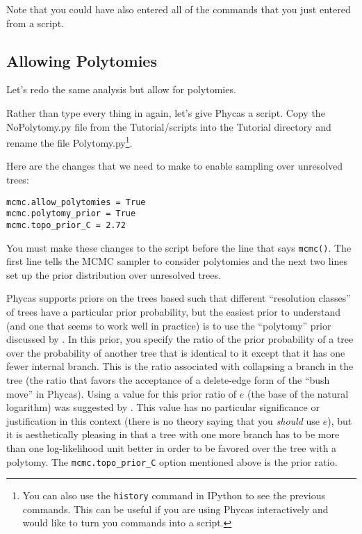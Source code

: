 \documentclass{article}
\newcommand{\cmd}[1]{\texttt{#1}\xspace}
\newcommand{\phycas}{Phycas\xspace}
\newcommand{\localfile}[1]{\textsf{#1}\xspace}
\begin{document}
Note that you could have also entered all of the commands that you just entered from a script. 

\subsection{Allowing Polytomies}
Let's redo the same analysis but allow for polytomies.

Rather than type every thing in again, let's give \phycas a script.
Copy the \localfile{NoPolytomy.py} file from the \localfile{Tutorial/scripts} 
into the \localfile{Tutorial} directory  and rename the file \localfile{Polytomy.py}\footnote{You can also use the \cmd{history} command in IPython to see the previous commands. This can be useful if you are using \phycas interactively and would
like to turn you commands into a script.}.

Here are the changes that we need to make to enable sampling over unresolved trees:
\begin{verbatim}
mcmc.allow_polytomies = True
mcmc.polytomy_prior = True
mcmc.topo_prior_C = 2.72
\end{verbatim}
You must make these changes to the script before the line that says \cmd{mcmc()}.
The first line tells the MCMC sampler to consider polytomies and the next  two lines
set up the prior distribution over unresolved trees.

\phycas supports priors on the trees based such that different ``resolution classes'' of trees have a particular prior probability, but the easiest prior to understand (and one that seems to work well in practice) is to use the ``polytomy'' prior discussed by \citet{LewisHolderHolsinger2005}.
In this prior, you specify the ratio of the prior probability of a tree over the probability of another tree that is identical to it except  that it has one fewer internal branch.
This is the ratio associated with collapsing a branch in the tree (the ratio that favors the 
acceptance of a delete-edge form of the ``bush move'' in \phycas).
Using a value for this prior ratio of $e$ (the base of the natural logarithm) was 
suggested by \citet{LewisHolderHolsinger2005}.
This value has no particular significance or justification in this
context (there is no theory saying that you {\em should} use $e$),
but it is aesthetically pleasing in that a tree with one more
branch has to be more than one log-likelihood unit better in
order to be favored over the tree with a polytomy.
The \cmd{mcmc.topo\_prior\_C} option mentioned above is the prior ratio.
\end{document}
